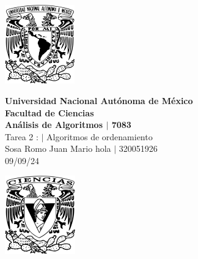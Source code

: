 \begin{center}
    \begin{minipage}{3cm}
    	\begin{center}
    		\includegraphics[height=3.4cm]{src/Img/Logo_UNAM.png}
    	\end{center}
    \end{minipage}\hfill
    \begin{minipage}{10cm}
    	\begin{center}
    	\textbf{\large Universidad Nacional Autónoma de México}\\[0.1cm]
        \textbf{Facultad de Ciencias}\\[0.1cm]
        \textbf{Análisis de Algoritmos  $|$ 7083}\\[0.1cm]
        Tarea 2 : $|$ Algoritmos de ordenamiento\\[0.1cm]
        Sosa Romo Juan Mario hola $|$ 320051926 \\[0.1cm]
        09/09/24
    	\end{center}
    \end{minipage}\hfill
    \begin{minipage}{3cm}
    	\begin{center}
    		\includegraphics[height=3.4cm]{src/Img/Logo_FC.png}
    	\end{center}
    \end{minipage}
\end{center}

